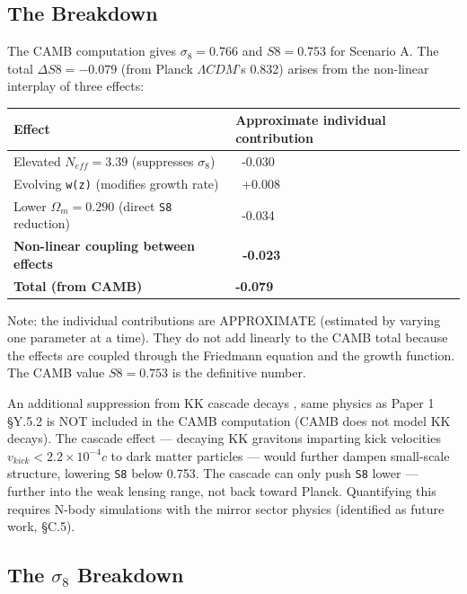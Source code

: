 \documentclass[aps,prd,preprint,superscriptaddress,longbibliography]{revtex4-2}
\begin{document}
\subsection{The Breakdown}

The CAMB computation gives $\sigma_{8} = 0.766$ and $S8 = 0.753$ for Scenario A. The total $\Delta S8 = -0.079$ (from Planck $\Lambda CDM$'s 0.832) arises from the non-linear interplay of three effects:


\begin{table}[H]
\begin{ruledtabular}
\begin{tabular}{p{7.5cm}p{7.5cm}}
Effect & Approximate individual contribution \\
\hline
Elevated $N_{eff} = 3.39$ (suppresses $\sigma_{8}$) & ~-0.030 \\
Evolving \texttt{w(z)} (modifies growth rate) & ~+0.008 \\
Lower $\Omega_m = 0.290$ (direct \texttt{S8} reduction) & ~-0.034 \\
\textbf{Non-linear coupling between effects} & \textbf{~-0.023} \\
\textbf{Total (from CAMB)} & \textbf{-0.079} \\
\end{tabular}
\end{ruledtabular}
\end{table}

Note: the individual contributions are APPROXIMATE (estimated by varying one parameter at a time). They do not add linearly to the CAMB total because the effects are coupled through the Friedmann equation and the growth function. The CAMB value $S8 = 0.753$ is the definitive number.

An additional suppression from KK cascade decays \cite{ObiedDarkDimensionS82023}, same physics as Paper 1 \S{}Y.5.2 is NOT included in the CAMB computation (CAMB does not model KK decays). The cascade effect --- decaying KK gravitons imparting kick velocities $v_{kick} < 2.2 \times 10^{-4} c$ to dark matter particles --- would further dampen small-scale structure, lowering \texttt{S8} below 0.753. The cascade can only push \texttt{S8} lower --- further into the weak lensing range, not back toward Planck. Quantifying this requires N-body simulations with the mirror sector physics (identified as future work, \S{}C.5).



\subsection{The $\sigma_{8}$ Breakdown}
\end{document}
